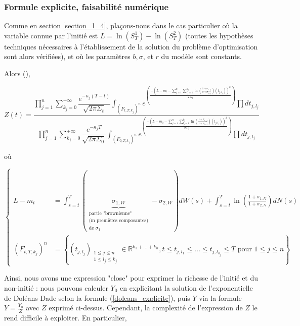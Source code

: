 \documentclass[../finalreport.tex]{subfiles}
\begin{document}
\subsubsection{Formule explicite, faisabilité numérique}

\par Comme en section \ref{section_1_4}, plaçons-nous dans le cas particulier où la variable connue par l'initié est $L = \ln \left( S_T^{1} \right) - \ln \left( S_T^{2} \right)$ (toutes les hypothèses techniques nécessaires à l'établissement de la solution du problème d'optimisation sont alors vérifiées), et où les paramètres $b, \sigma$, et $r$ du modèle sont constants.

\par Alors (\cite{art5}), 

\begin{displaymath}
Z \left( t \right) = \dfrac{\prod\limits_{j = 1}^{n} \sum\limits_{k_j = 0}^{+ \infty} \dfrac{e^{- {\kappa}_j \left( T - t\right)}}{\sqrt{2 \pi {\Sigma}_t}} {\displaystyle \int_{{\left( F_{t, T, k_j}\right)}^n}} e^{\left( \frac{- \left( L - m_t - \sum\limits_{j = 1}^{n} \sum\limits_{l_j = 1}^{k_j} \ln \left( \frac{1 + {\sigma}_{i_1, j}}{1 + {\sigma}_{i_2, j}} \right) \left( t_{j, l_j} \right) \right)^2}{2 {\Sigma}_t} \right)} \prod d t_{j, l_j}}{\prod\limits_{j = 1}^{n} \sum\limits_{k_j = 0}^{+ \infty} \dfrac{e^{- {\kappa}_j T}}{\sqrt{2 \pi {\Sigma}_0}} {\displaystyle \int_{{\left( F_{0, T, k_j}\right)}^n}} e^{\left( \frac{- \left( L - m_0 - \sum\limits_{j = 1}^{n} \sum\limits_{l_j = 1}^{k_j} \ln \left( \frac{1 + {\sigma}_{i_1, j}}{1 + {\sigma}_{i_2, j}} \right) \left( t_{j, l_j} \right) \right)^2}{2 {\Sigma}_t} \right)} \prod d t_{j, l_j}}
\end{displaymath}

où

\begin{displaymath}
\begin{cases}
L - m_t &= \displaystyle \int_{s = t}^{T} \left( \underbrace{\sigma_{1, W}}_{\substack{\text{partie "brownienne"} \\ \text{(m premières composantes)} \\ \text{de } \sigma_1}} - \sigma_{2, W} \right) dW(s) + \int_{s = t}^{T} \ln \left( \frac{1 + \sigma_{1, N}}{1 + \sigma_{2, N}} \right) dN(s) \\
{\left( F_{t, T, k_j}\right)}^n &= \left\lbrace \left( t_{j, l_j} \right)_{\substack{1\leq j\leq n \\ 1\leq l_j\leq k_j}} \in \mathbb{R}^{k_1 + ... + k_n}, t \leq t_{j, l_1} \leq ... \leq t_{j, l_{k_j}} \leq T \text{ pour } 1 \leq j \leq n \right\rbrace
\end{cases}
\end{displaymath}

\par Ainsi, nous avons une expression "close" pour exprimer la richesse de l'initié et du non-initié : nous pouvons calculer $Y_0$ en explicitant la solution de l'exponentielle de Doléans-Dade selon la formule (\ref{doleans_explicite}), puis $Y$ via la formule $Y = \frac{Y_0}{Z}$ avec $Z$ exprimé ci-dessus. Cependant, la complexité de l'expression de $Z$ le rend difficile à exploiter. En particulier, 
\end{document}
